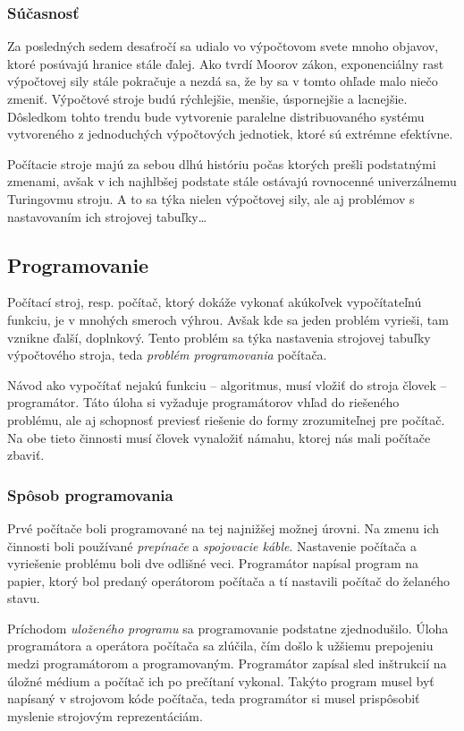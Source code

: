 \subsubsection{Súčasnosť}

Za posledných sedem desaťročí sa udialo vo výpočtovom svete mnoho objavov, ktoré posúvajú hranice stále ďalej. Ako tvrdí Moorov zákon, exponenciálny rast výpočtovej sily stále pokračuje a nezdá sa, že by sa v tomto ohľade malo niečo zmeniť. Výpočtové stroje budú rýchlejšie, menšie, úspornejšie a lacnejšie. Dôsledkom tohto trendu bude vytvorenie paralelne distribuovaného systému vytvoreného z jednoduchých výpočtových jednotiek, ktoré sú extrémne efektívne.

Počítacie stroje majú za sebou dlhú históriu počas ktorých prešli podstatnými zmenami, avšak v ich najhlbšej podstate stále ostávajú rovnocenné univerzálnemu Turingovmu stroju. A to sa týka nielen výpočtovej sily, ale aj problémov s nastavovaním ich strojovej tabuľky\dots

\subsection{Programovanie}

Počítací stroj, resp. počítač, ktorý dokáže vykonať akúkoľvek vypočítateľnú funkciu, je v mnohých smeroch výhrou. Avšak kde sa jeden problém vyrieši, tam vznikne ďalší, doplnkový. Tento problém sa týka nastavenia strojovej tabuľky výpočtového stroja, teda \emph{problém programovania} počítača.

Návod ako vypočítať nejakú funkciu -- algoritmus, musí vložiť do stroja človek -- programátor. Táto úloha si vyžaduje programátorov vhľad do riešeného problému, ale aj schopnosť previesť riešenie do formy zrozumiteľnej pre počítač. Na obe tieto činnosti musí človek vynaložiť námahu, ktorej nás mali počítače zbaviť.

\subsubsection{Spôsob programovania}

Prvé  počítače boli programované na tej najnižšej možnej úrovni. Na zmenu ich činnosti boli používané \emph{prepínače} a \emph{spojovacie káble}. Nastavenie počítača a vyriešenie problému boli dve odlišné veci. Programátor napísal program na papier, ktorý bol predaný operátorom počítača a tí nastavili počítač do želaného stavu.

Príchodom \emph{uloženého programu} sa programovanie podstatne zjednodušilo. Úloha programátora a operátora počítača sa zlúčila, čím došlo k užšiemu prepojeniu medzi programátorom a programovaným. Programátor zapísal sled inštrukcií na úložné médium a počítač ich po prečítaní vykonal. Takýto program musel byť napísaný v strojovom kóde počítača, teda programátor si musel prispôsobiť myslenie strojovým reprezentáciám.

